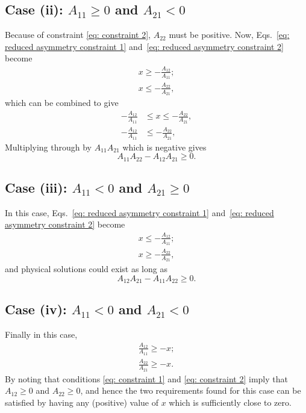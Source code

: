 \subsection*{Case (ii): $A_{11} \geq 0$ and $A_{21} < 0$}
Because of constraint \eqref{eq: constraint 2}, $A_{22}$ must be positive. Now, Eqs.~\eqref{eq: reduced asymmetry constraint 1} and~\eqref{eq: reduced asymmetry constraint 2} become
\begin{align}
    x \geq - \frac{A_{12}}{A_{11}}; \label{eq: case 2-1} \\ 
    x \leq - \frac{A_{22}}{A_{21}},\label{eq: case 2-2}
\end{align}
which can be combined to give
\begin{align}
    - \frac{A_{12}}{A_{11}} &\leq x \leq - \frac{A_{22}}{A_{21}},\\
    - \frac{A_{12}}{A_{11}} &\leq - \frac{A_{22}}{A_{21}},
\end{align} 
Multiplying through by $A_{11}A_{21}$ which is negative gives
\begin{equation}
    A_{11}A_{22} -A_{12}A_{21} \geq 0.
\end{equation}

\subsection*{Case (iii): $A_{11} < 0$ and $A_{21} \geq 0$}
In this case, Eqs.~\eqref{eq: reduced asymmetry constraint 1} and~\eqref{eq: reduced asymmetry constraint 2} become
\begin{align}
    x \leq - \frac{A_{12}}{A_{11}}; \label{eq: case 3-1}\\
    x \geq - \frac{A_{22}}{A_{21}},\label{eq: case 3-2}
\end{align}
and physical solutions could exist as long as
\begin{equation}
    A_{12}A_{21} -A_{11}A_{22} \geq 0.
\end{equation}

\subsection*{Case (iv): $A_{11} < 0$ and $A_{21} < 0$}
Finally in this case,
\begin{align}
    \frac{A_{12}}{A_{11}} \ge - x; \label{eq: case 4-1}\\
    \frac{A_{22}}{A_{21}} \geq -x. \label{eq: case 4-2}
\end{align}
By noting that conditions \eqref{eq: constraint 1} and \eqref{eq: constraint 2} imply that $A_{12} \geq 0$ and $A_{22} \geq 0$, and hence the two requirements found for this case can be satisfied by having any (positive) value of $x$ which is sufficiently close to zero.

